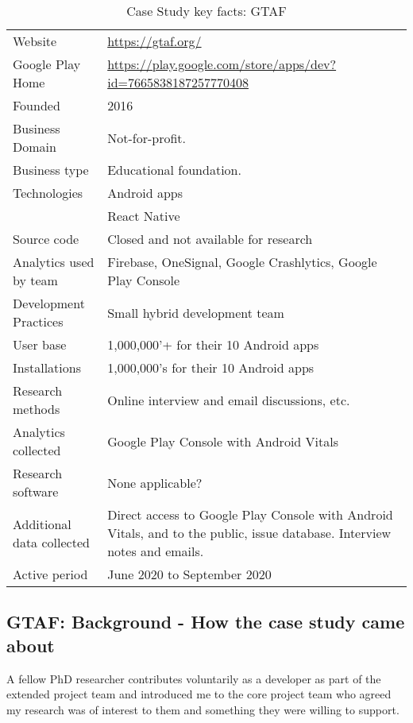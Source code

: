 {\renewcommand{\arraystretch}{0.8}%
\begin{table}[htbp!]
    \centering
    \small
    \setlength{\tabcolsep}{1pt}
    \begin{tabular}{lp{11cm}}
       \toprule
       Website &\url{https://gtaf.org/} \\
       Google Play Home & \url{https://play.google.com/store/apps/dev?id=7665838187257770408} \\
       Founded & 2016 \\
       Business Domain & Not-for-profit.  \\
       Business type & Educational foundation. \\
       Technologies  & Android apps\footnotemark \\
       & React Native \\
       Source code  & Closed and not available for research \\
       Analytics used by team & Firebase, OneSignal, Google Crashlytics, Google Play Console \\
       Development Practices & Small hybrid development team \\
       \midrule
       User base & 1,000,000'+ for their 10 Android apps \\
       Installations & 1,000,000's for their 10 Android apps \\
       \midrule
       Research methods &Online interview and email discussions, etc. \\
       Analytics collected &Google Play Console with Android Vitals \\
       Research software & None applicable? \\
       Additional data collected &Direct access to Google Play Console with Android Vitals, and to the public, issue database. Interview notes and emails. \\
       Active period & June 2020 to September 2020 \\
       \bottomrule
    \end{tabular}
    \caption{Case Study key facts: GTAF}
    \label{tab:gtaf_anaytics_overview}
\end{table}
}


\subsection{GTAF: Background - How the case study came about}
A fellow PhD researcher contributes voluntarily as a developer as part of the extended project team and introduced me to the core project team who agreed my research was of interest to them and something they were willing to support.

